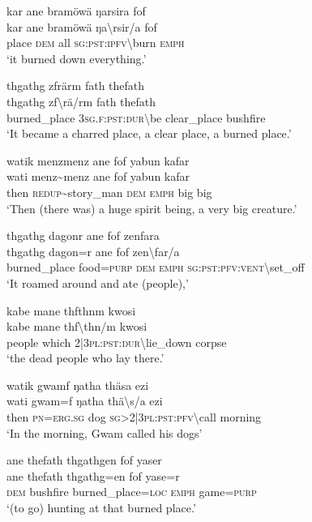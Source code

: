 \ea\label{ex:1:a3521}
kar ane bramöwä ŋarsira fof\\
\gll kar	ane	bramöwä	ŋa{\textbackslash}rsir/a	fof\\
     place	\textsc{dem}	all	\textsc{sg}:\textsc{pst}:\textsc{ipfv}{\textbackslash}burn	\textsc{emph}\\
\glt `it burned down everything.'
\z

\ea\label{ex:1:a3522}
thgathg zfrärm fath thefath\\
\gll thgathg	zf{\textbackslash}rä/rm	fath	thefath\\
     burned\_place	3\textsc{sg}.\textsc{f}:\textsc{pst}:\textsc{dur}{\textbackslash}be	clear\_place	bushfire\\
\glt `It became a charred place, a clear place, a burned place.'
\z

\ea\label{ex:1:a3523}
watik menzmenz ane fof yabun kafar\\
\gll wati	menz{\textasciitilde}menz	ane	fof	yabun	kafar\\
     then	\textsc{redup}{\textasciitilde}story\_man	\textsc{dem}	\textsc{emph}	big	big\\
\glt `Then (there was) a huge spirit being, a very big creature.'
\z

\ea\label{ex:1:a3526}
thgathg dagonr ane fof zenfara\\
\gll thgathg	dagon=r	ane	fof	zen{\textbackslash}far/a\\
     burned\_place	food=\textsc{purp}	\textsc{dem}	\textsc{emph}	\textsc{sg}:\textsc{pst}:\textsc{pfv}:\textsc{vent}{\textbackslash}set\_off\\
\glt `It roamed around and ate (people),'
\z

\ea\label{ex:1:a3527}
kabe mane thfthnm kwosi\\
\gll kabe	mane	thf{\textbackslash}thn/m	kwosi\\
     people	which	2|3\textsc{pl}:\textsc{pst}:\textsc{dur}{\textbackslash}lie\_down	corpse\\
\glt `the dead people who lay there.'
\z

\ea\label{ex:1:a3528}
watik gwamf ŋatha thäsa ezi\\
\gll wati	gwam=f	ŋatha	thä{\textbackslash}s/a	ezi\\
     then	\textsc{pn}=\textsc{erg}.\textsc{sg}	dog	\textsc{sg}>2|3\textsc{pl}:\textsc{pst}:\textsc{pfv}{\textbackslash}call	morning\\
\glt `In the morning, Gwam called his dogs'
\z

\ea\label{ex:1:a3531}
ane thefath thgathgen fof yaser\\
\gll ane	thefath	thgathg=en	fof	yase=r\\
     \textsc{dem}	bushfire	burned\_place=\textsc{loc}	\textsc{emph}	game=\textsc{purp}\\
\glt `(to go) hunting at that burned place.'
\z

